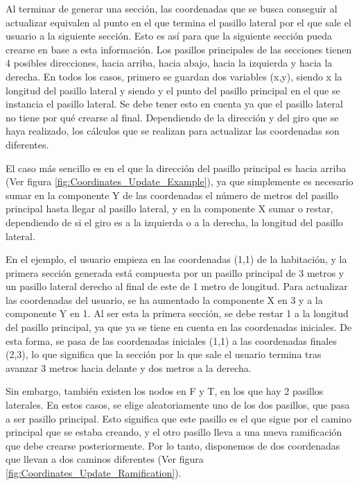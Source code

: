 \documentclass[../main.tex]{subfiles}
\begin{document}
Al terminar de generar una sección, las coordenadas que se busca conseguir al actualizar equivalen al punto en el que termina el pasillo lateral por el que sale el usuario a la siguiente sección. Esto es así para que la siguiente sección pueda crearse en base a esta información. Los pasillos principales de las secciones tienen 4 posibles direcciones, hacia arriba, hacia abajo, hacia la izquierda y hacia la derecha. En todos los casos, primero se guardan dos variables (x,y), siendo x la longitud del pasillo lateral y siendo y el punto del pasillo principal en el que se instancia el pasillo lateral. Se debe tener esto en cuenta ya que el pasillo lateral no tiene por qué crearse al final. Dependiendo de la dirección y del giro que se haya realizado, los cálculos que se realizan para actualizar las coordenadas son diferentes. 

El caso más sencillo es en el que la dirección del pasillo principal es hacia arriba (Ver figura \ref{fig:Coordinates_Update_Example}), ya que simplemente es necesario sumar en la componente Y de las coordenadas el número de metros del pasillo principal hasta llegar al pasillo lateral, y en la componente X sumar o restar, dependiendo de si el giro es a la izquierda o a la derecha, la longitud del pasillo lateral.

En el ejemplo, el usuario empieza en las coordenadas (1,1) de la habitación, y la primera sección generada está compuesta por un pasillo principal de 3 metros y un pasillo lateral derecho al final de este de 1 metro de longitud. Para actualizar las coordenadas del usuario, se ha aumentado la componente X en 3 y a la componente Y en 1. Al ser esta la primera sección, se debe restar 1 a la longitud del pasillo principal, ya que ya se tiene en cuenta en las coordenadas iniciales. De esta forma, se pasa de las coordenadas iniciales (1,1) a las coordenadas finales (2,3), lo que significa que la sección por la que sale el usuario termina tras avanzar 3 metros hacia delante y dos metros a la derecha.

Sin embargo, también existen los nodos en F y T, en los que hay 2 pasillos laterales. En estos casos, se elige aleatoriamente uno de los dos pasillos, que pasa a ser pasillo principal. Esto significa que este pasillo es el que sigue por el camino principal que se estaba creando, y el otro pasillo lleva a una nueva ramificación que debe crearse posteriormente. Por lo tanto, disponemos de dos coordenadas que llevan a dos caminos diferentes (Ver figura \ref{fig:Coordinates_Update_Ramification}).
\end{document}
